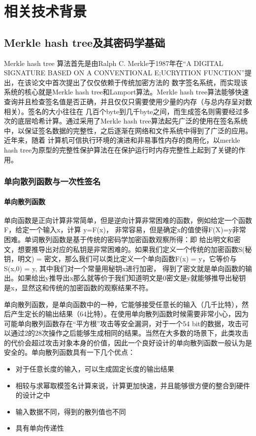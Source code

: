 
\chapter{相关技术背景}

\section{Merkle hash tree及其密码学基础}
Merkle hash tree \cite{merkle1987digital}算法首先是由Ralph C. Merkle于1987年在“A DIGITAL SIGNATURE BASED ON A CONVENTIONAL E;UCRYITION FUNCTION”提出，在该论文中首次提出了仅仅依赖于传统加密方法的
数字签名系统，而实现该系统的核心就是Merkle hash tree和Lamport算法。Merkle hash tree算法能够快速查询并且检查签名值是否正确，并且仅仅只需要使用少量的内存（与总内存呈对数相关）。签名的大小往往在
几百个byte到几千byte之间，而生成签名则需要经过多次的底层哈希计算。通过采用了Merkle hash tree算法起先广泛的使用在签名系统中，以保证签名数据的完整性，之后逐渐在网络和文件系统中得到了广泛的应用。近年来，随着
计算机可信执行环境的演进和非易事性内存的商用化，以merkle hash tree为原型的完整性保护算法在在保护运行时内存完整性上起到了关键的作用。

\subsection{单向散列函数与一次性签名}
\subsubsection{单向散列函数}
单向函数是正向计算非常简单，但是逆向计算非常困难的函数，例如给定一个函数F，给定一个输入x，计算 y=F(x)， 非常容易，但是确定x的值使得F(X)=y非常困难。单词散列函数是基于传统的密码学加密函数观察所得：即
给出明文和密文，想要推导出对应的私钥是非常困难的。如果我们定义一个传统的加密函数S(秘钥，明文) = 密文，那么我们可以类比定义一个单向函数F(x) = y，它等价与S(x,0) = y, 其中我们对一个常量用秘钥x进行加密，
得到了密文就是单向函数的输出。如果给出y推导出x那么就等价于我们知道明文是0密文是y就能够推导出秘钥是x，显然这和传统的加密函数的观察结果不符。

单向散列函数，是单向函数中的一种，它能够接受任意长的输入（几千比特），然后产生定长的输出结果（64比特）。在使用单向散列函数时候需要非常小心，因为可能单向散列函数存在“平方根”攻击等安全漏洞，对于一个54
bit的数据，攻击可以通过2的28次操作之后能够生成相同的结果。当然在大多数的场景下，此类攻击的代价会超过攻击对象本身的价值，因此一个良好设计的单向散列函数一般认为是安全的。单向散列函数具有一下几个优点：
\begin{itemize}
    \item 对于任意长度的输入，可以生成固定长度的输出结果
    \item 相较与求幂取模签名计算来说，计算更加快速，并且能够很方便的整合到硬件的设计之中
    \item 输入数据不同，得到的散列值也不同
    \item 具有单向传递性
\end{itemize}


